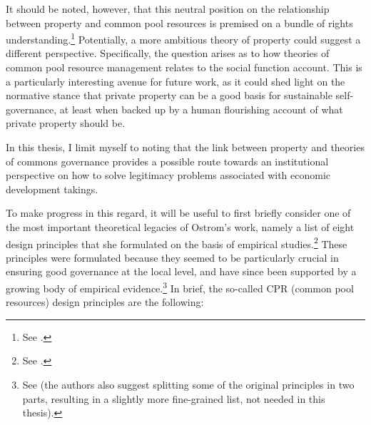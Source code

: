 It should be noted, however, that this neutral position on the relationship between property and common pool resources is premised on a bundle of rights understanding.\footnote{See \cite[59]{ostrom10b}.} Potentially, a more ambitious theory of property could suggest a different perspective. Specifically, the question arises as to how theories of common pool resource management relates to the social function account. This is a particularly interesting avenue for future work, as it could shed light on the normative stance that private property can be a good basis for sustainable self-governance, at least when backed up by a human flourishing account of what private property should be.

In this thesis, I limit myself to noting that the link between property and theories of commons governance provides a possible route towards an institutional perspective on how to solve legitimacy problems associated with economic development takings.

To make progress in this regard, it will be useful to first briefly consider one of the most important theoretical legacies of Ostrom's work, namely a list of eight design principles that she formulated on the basis of empirical studies.\footnote{See \cite[90]{ostrom90}.} These principles were formulated because they seemed to be particularly crucial in ensuring good governance at the local level, and have since been supported by a growing body of empirical evidence.\footnote{See \cite{cox10} (the authors also suggest splitting some of the original principles in two parts, resulting in a slightly more fine-grained list, not needed in this thesis). } In brief, the so-called CPR (common pool resources) design principles are the following:

